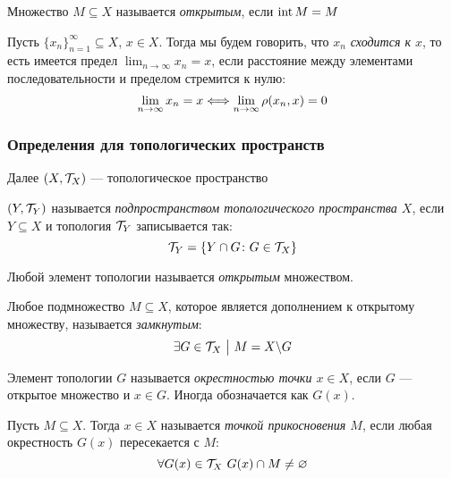 \begin{definition}
	Множество $M \subseteq X$ называется \textit{открытым}, если $\operatorname{int} M = M$
\end{definition}

\begin{definition}
	Пусть $\{x_n\}_{n = 1}^\infty \subseteq X$, $x \in X$. Тогда мы будем говорить, что \textit{$x_n$ сходится к $x$}, то есть имеется предел $\lim_{n \to \infty} x_n = x$, если расстояние между элементами последовательности и пределом стремится к нулю:
	\[
		\lim_{n \to \infty} x_n = x \Longleftrightarrow \lim_{n \to \infty} \rho(x_n, x) = 0
	\]
\end{definition}

\subsubsection*{Определения для топологических пространств}

\begin{note}
	Далее $(X, \mathcal{T}_X)$ --- топологическое пространство
\end{note}

\begin{definition}
	$(Y, \mathcal{T}_Y)$ называется \textit{подпространством топологического пространства $X$}, если $Y \subseteq X$ и топология $\mathcal{T}_Y$ записывается так:
	\[
		\mathcal{T}_Y = \{Y \cap G \colon G \in \mathcal{T}_X\}
	\]
\end{definition}

\begin{definition}
	Любой элемент топологии называется \textit{открытым} множеством.
\end{definition}

\begin{definition}
	Любое подмножество $M \subseteq X$, которое является дополнением к открытому множеству, называется \textit{замкнутым}:
	\[
		\exists G \in \mathcal{T}_X \ \big|\  M = X \backslash G
	\]
\end{definition}

\begin{definition}
	Элемент топологии $G$ называется \textit{окрестностью точки $x \in X$}, если $G$ --- открытое множество и $x \in G$. Иногда обозначается как $G(x)$.
\end{definition}

\begin{definition}
	Пусть $M \subseteq X$. Тогда $x \in X$ называется \textit{точкой прикосновения $M$}, если любая окрестность $G(x)$ пересекается с $M$:
	\[
		\forall G(x) \in \mathcal{T}_X\ G(x) \cap M \neq \varnothing
	\]
\end{definition}


